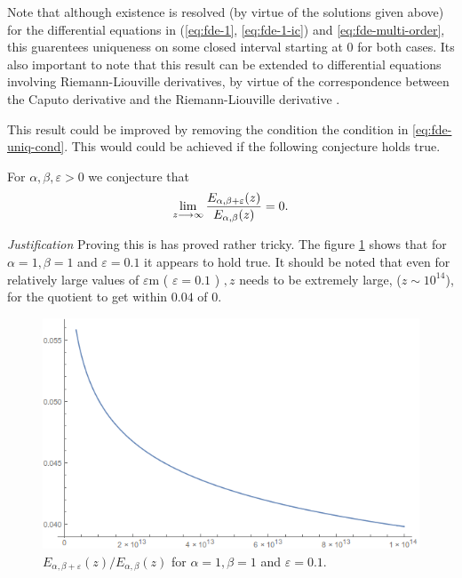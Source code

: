 Note that although existence is resolved (by virtue of the solutions given above)
for the differential equations in (\ref{eq:fde-1}, \ref{eq:fde-1-ic}) and \ref{eq:fde-multi-order}, this 
guarentees uniqueness on some closed interval starting at $ 0 $ for both cases. Its also important
to note that this result can be extended to differential equations involving Riemann-Liouville derivatives, by 
virtue of the correspondence between the Caputo derivative and the Riemann-Liouville derivative \cite{Podlubny1999}. 

This result could be improved by removing the condition the condition in  \eqref{eq:fde-uniq-cond}. This would could be achieved if the following conjecture holds true.
\begin{mdframed}[innertopmargin=10pt]
\begin{conjecture}
    For $ \alpha, \beta, \varepsilon > 0 $ we conjecture that
    \begin{align}
        \lim_{z\longrightarrow \infty} \frac{E_{\alpha, \beta + \varepsilon}(z)}{E_{\alpha, \beta}(z)} = 0.
    \end{align}
\end{conjecture}
\end{mdframed}
\emph{Justification}
Proving this is has proved rather tricky. The figure \ref{fig:mittag-quotient} shows that for $ \alpha = 1, \beta = 1 $ and $ \varepsilon = 0.1 $ it appears to hold true. It should be noted that even for relatively large values of $ \varepsilon $m ( $ \varepsilon = 0.1 $ ) $, z $ needs to be extremely large, ($ z \sim 10^{14} $), for the quotient to get within $ 0.04 $ of $ 0 $. 
\begin{figure}[H]
\includegraphics[scale=0.6]{images/Mittag-Leffler-Quotient}
\caption{$ E_{\alpha, \beta + \varepsilon}(z) / E_{\alpha, \beta}(z) $ for $ \alpha = 1, \beta = 1 $ and $ \varepsilon = 0.1 $.}
\label{fig:mittag-quotient}
\end{figure}


